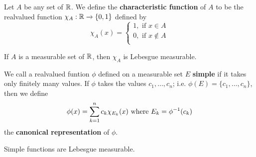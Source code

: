 \begin{definition}
    Let $A$ be any set of  $\mathbb{R}$. We define the  \textbf{characteristic function}
    of $A$ to be the realvalued function  $\chi_A:\mathbb{R} \xrightarrow{} \{0,1\}$
    defined by
    \begin{equation*}
        \chi_A(x)=  \begin{cases}
                     1, \text{ if } x \in A \\
                     0, \text{ if } x \notin A \\
                 \end{cases}
    \end{equation*}
\end{definition}

\begin{lemma}\label{9.2.2}
    If $A$ is a measurable set of  $\mathbb{R}$, then  $\chi_A$ is Lebesgue measurable.
\end{lemma}

\begin{definition}
    We call a realvalued funtion $\phi$ defined on a measurable set $E$
    \textbf{simple} if it takes only finitely many values. If $\phi$ takes the
    values $c_1, \dots, c_n$; i.e. $\phi(E)=\{c_1, \dots, c_n\}$, then we define
    \begin{equation*}
        \phi(x)=\sum_{k=1}^n{c_k\chi_{E_k}(x)} \text{ where } E_k=\phi^{-1}(c_k)
    \end{equation*}
    the \textbf{canonical representation} of $\phi$.
\end{definition}

\begin{lemma}\label{9.2.3}
    Simple functions are Lebesgue measurable.
\end{lemma}

